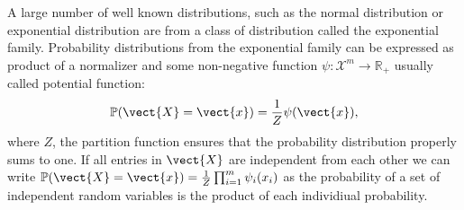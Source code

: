 A large number of well known distributions, such as the normal distribution or exponential distribution are from a class of distribution called the exponential family.
Probability distributions from the exponential family can be expressed as product of a normalizer and some non-negative function $\psi: \mathcal{X}^m \rightarrow \mathbb{R}_+$ usually called potential function:
\begin{equation}
    \label{eq:probpot}
    \mathbb{P}(\vect{X} = \vect{x}) = \frac{1}{Z} \psi(\vect{x}),
\end{equation}
where $Z$, the partition function ensures that the probability distribution properly sums to one.
If all entries in $\vect{X}$ are independent from each other we can write $\mathbb{P}(\vect{X} = \vect{x}) = \frac{1}{Z} \prod_{i=1}^m \psi_i(x_i)$ as the probability of a set of independent random variables is the product of each individiual probability.

